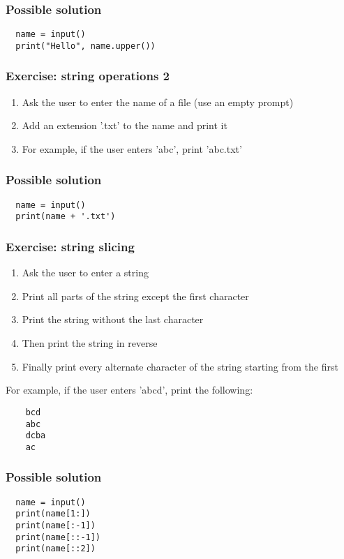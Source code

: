 \documentclass[14pt,compress]{beamer}
\begin{document}
\begin{frame}
\frametitle{Possible solution}
\begin{lstlisting}
  name = input()
  print("Hello", name.upper())
\end{lstlisting}
\end{frame}

\begin{frame}[plain]
  \frametitle{Exercise: string operations 2}
  \begin{enumerate}
  \item Ask the user to enter the name of a file (use an empty prompt)
  \item Add an extension '.txt' to the name and print it
  \item For example, if the user enters 'abc', print 'abc.txt'
  \end{enumerate}
\end{frame}

\begin{frame}
\frametitle{Possible solution}
\begin{lstlisting}
  name = input()
  print(name + '.txt')
\end{lstlisting}

\end{frame}


\begin{frame}
  \frametitle{Exercise: string slicing}
  \begin{enumerate}
  \item Ask the user to enter a string
  \item Print all parts of the string except the first character
  \item Print the string without the last character
  \item Then print the string in reverse
  \item Finally print every alternate character of the string starting from
    the first
  \end{enumerate}
  For example, if the user enters 'abcd', print the following:
  \begin{lstlisting}
    bcd
    abc
    dcba
    ac
  \end{lstlisting}
\end{frame}

\begin{frame}
\frametitle{Possible solution}
\begin{lstlisting}
  name = input()
  print(name[1:])
  print(name[:-1])
  print(name[::-1])
  print(name[::2])
\end{lstlisting}

\end{frame}
\end{document}
